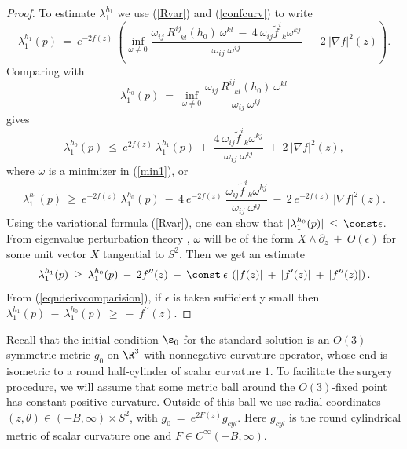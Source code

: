 \begin{proof}
To estimate $\lambda_1^{h_1}$ we use
(\ref{Rvar}) and (\ref{confcurv}) to write
\begin{equation} \label{min1}
\lambda_1^{h_1}(p) \: = \: e^{-2f(z)} \: \left(
\inf_{\omega \neq 0} \frac{\omega_{ij} \: R^{ij}_{\: \: \: kl}(h_0) \: \omega^{kl}
\: - \: 4 \: \omega_{ij} \widetilde{f}^i_{\: \: k} \omega^{kj}}{\omega_{ij} \: \omega^{ij}} \: - \: 2 \: |\nabla f|^2(z) \right).
\end{equation}
Comparing with
\begin{equation}
\lambda_1^{h_0}(p) \: = \:
\inf_{\omega \neq 0} \frac{\omega_{ij} \: R^{ij}_{\: \: \: kl}(h_0) \: \omega^{kl}}{
\omega_{ij} \: \omega^{ij}}
\end{equation}
gives
\begin{equation}
\lambda_1^{h_0}(p) \: \le \: e^{2f(z)} \: \lambda_1^{h_1}(p) \: + \:
\frac{4 \: \omega_{ij} \widetilde{f}^i_{\: \: k} \omega^{kj}}{\omega_{ij} \: \omega^{ij}} \: + \: 2 \: |\nabla f|^2(z),
\end{equation}
where $\omega$ is a minimizer in (\ref{min1}), or
\begin{equation}
\lambda_1^{h_1}(p) \: \ge \: e^{- 2f(z)} \: \lambda_1^{h_0}(p) \: - \:
4 \: e^{- 2f(z)} \:
\frac{\omega_{ij} \widetilde{f}^i_{\: \: k} \omega^{kj}}{\omega_{ij} \: \omega^{ij}}
\: - \: 2 \: e^{- 2f(z)} \: |\nabla f|^2(z).
\end{equation}
Using the variational formula (\ref{Rvar}), one can show that
$|\lambda_1^{h_0}(p)| \: \le \: \const \epsilon$.
From eigenvalue perturbation theory
\cite[Chapter 12]{Reed-Simon},
$\omega$ will be of the
form $X \wedge \partial_z \: + \: O(\epsilon)$ for some unit vector $X$ tangential
to $S^2$. Then we get an estimate
\begin{equation}
\lambda_1^{h_1}(p) \: \ge \: \lambda_1^{h_0}(p) \: - \:
2 f^{\prime \prime}(z) \: - \:
\const \: \epsilon \: \left( |f(z)| \: + \: |f^\prime(z)| \: + \:
|f^{\prime \prime}(z)| \right).
\end{equation}
From (\ref{eqnderivcomparision}), if $\epsilon$ is taken sufficiently small
then $\lambda_1^{h_1}(p) \: - \: \lambda_1^{h_0}(p) \: \ge \:  - \:
f^{\prime \prime}(z)$.
\end{proof}

Recall that the initial condition $\s_0$ for the standard solution  is
an $O(3)$-symmetric metric
$g_0$
 on $\R^3$ with nonnegative curvature operator, whose
end is isometric to a round half-cylinder of scalar curvature $1$.
To facilitate the surgery procedure, we will assume that some metric
ball around
the $O(3)$-fixed point has constant positive curvature. Outside of
this ball we use radial coordinates
$(z, \theta) \in (-B,\infty) \times S^2$, with
$g_{0} \: = \: e^{2F(z)} g_{cyl}$.
Here $g_{cyl}$ is the round cylindrical metric of scalar curvature one
and $F \in  C^\infty(-B,\infty)$.

